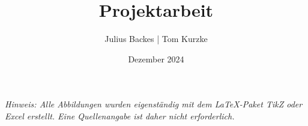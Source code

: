 \documentclass[a4paper,12pt, final]{article}
\title{Projektarbeit}
\author{Julius Backes | Tom Kurzke}
\date{Dezember 2024}
\begin{document}
\pagestyle{fancy}
\usetikzlibrary {
    arrows.meta,
    graphs,
    graphdrawing,
    matrix,
    ext.node-families,
    ext.positioning-plus,
    ext.paths.ortho
} 






\newpage

\tableofcontents

\newpage

\listoffigures
\vspace{1cm}
\noindent \textit{Hinweis: Alle Abbildungen wurden eigenständig mit dem \LaTeX-Paket TikZ oder Excel erstellt. Eine Quellenangabe ist daher nicht erforderlich.}











\end{document}
